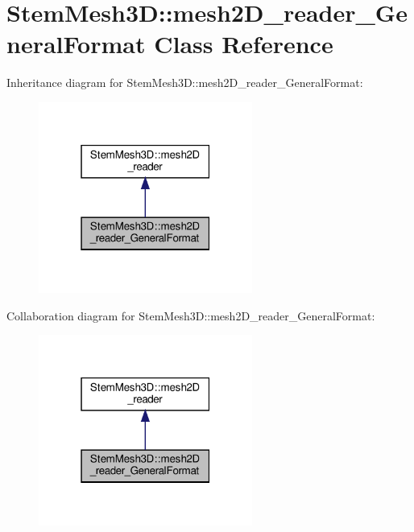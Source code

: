 \hypertarget{classStemMesh3D_1_1mesh2D__reader__GeneralFormat}{}\section{Stem\+Mesh3D\+:\+:mesh2\+D\+\_\+reader\+\_\+\+General\+Format Class Reference}
\label{classStemMesh3D_1_1mesh2D__reader__GeneralFormat}


Inheritance diagram for Stem\+Mesh3D\+:\+:mesh2\+D\+\_\+reader\+\_\+\+General\+Format\+:\nopagebreak
\begin{figure}[H]
\begin{center}
\leavevmode
\includegraphics[width=199pt]{classStemMesh3D_1_1mesh2D__reader__GeneralFormat__inherit__graph}
\end{center}
\end{figure}


Collaboration diagram for Stem\+Mesh3D\+:\+:mesh2\+D\+\_\+reader\+\_\+\+General\+Format\+:\nopagebreak
\begin{figure}[H]
\begin{center}
\leavevmode
\includegraphics[width=199pt]{classStemMesh3D_1_1mesh2D__reader__GeneralFormat__coll__graph}
\end{center}
\end{figure}
